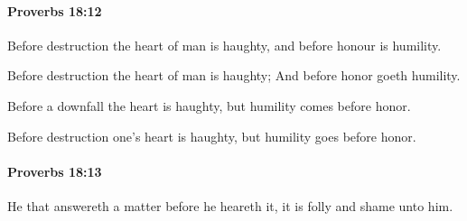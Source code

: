		\paragraph{Proverbs 18:12} %
			\label{PROVERBS-18-12}

			Before destruction the heart of man is haughty, and before honour is humility.

			\begin{versebox}
					\item[BHS] 
					\item[ASV] Before destruction the heart of man is haughty; And before honor goeth humility.
					\item[NIV] Before a downfall the heart is haughty, but humility comes before honor.
					\item[NRSV] Before destruction one’s heart is haughty, but humility goes before honor.
			\end{versebox}

		\paragraph{Proverbs 18:13} %
			\label{PROVERBS-18-13}

			He that answereth a matter before he heareth it, it is folly and shame unto him.

